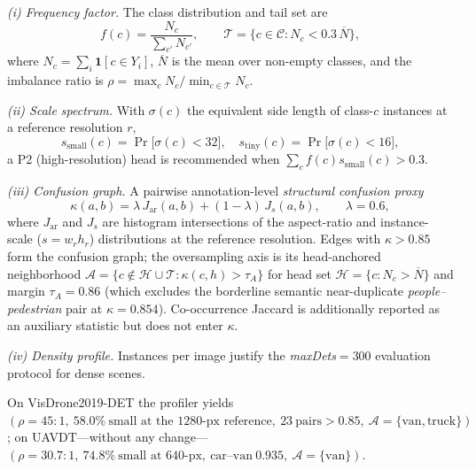 \documentclass[journal]{IEEEtran}
\newcommand{\visdrone}{VisDrone2019-DET}
\newcommand{\uavdt}{UAVDT}
\begin{document}
\emph{(i) Frequency factor.} The class distribution and tail set are
\begin{equation}
f(c)=\frac{N_c}{\sum_{c'} N_{c'}},\qquad
\mathcal{T}=\{c\in\mathcal{C}: N_c < 0.3\,\overline{N}\},
\label{eq:tail}
\end{equation}
where $N_c=\sum_i\mathbf{1}[c\in Y_i]$, $\overline{N}$ is the mean over non-empty classes, and the imbalance ratio is $\rho=\max_c N_c/\min_{c\in\mathcal{T}}N_c$.

\emph{(ii) Scale spectrum.} With $\sigma(c)$ the equivalent side length of class-$c$ instances at a reference resolution $r$,
\begin{equation}
s_{\mathrm{small}}(c)=\Pr\big[\sigma(c)<32\big],\quad
s_{\mathrm{tiny}}(c)=\Pr\big[\sigma(c)<16\big],
\label{eq:scale}
\end{equation}
a P2 (high-resolution) head is recommended when $\sum_c f(c)s_{\mathrm{small}}(c)>0.3$.

\emph{(iii) Confusion graph.} A pairwise annotation-level \emph{structural confusion proxy}
\begin{equation}
\kappa(a,b)=\lambda\,J_{\mathrm{ar}}(a,b)+(1-\lambda)\,J_{s}(a,b),\qquad \lambda=0.6,
\label{eq:conf}
\end{equation}
where $J_{\mathrm{ar}}$ and $J_{s}$ are histogram intersections of the aspect-ratio and instance-scale ($s{=}w_r h_r$) distributions at the reference resolution. Edges with $\kappa>0.85$ form the confusion graph; the oversampling axis is its head-anchored neighborhood $\mathcal{A}=\{c\notin\mathcal{H}\cup\mathcal{T}:\kappa(c,h)>\tau_A\}$ for head set $\mathcal{H}=\{c:N_c>\overline{N}\}$ and margin $\tau_A{=}0.86$ (which excludes the borderline semantic near-duplicate \emph{people--pedestrian} pair at $\kappa{=}0.854$). Co-occurrence Jaccard is additionally reported as an auxiliary statistic but does not enter $\kappa$.

\emph{(iv) Density profile.} Instances per image justify the \emph{maxDets}$=300$ evaluation protocol for dense scenes.

On \visdrone{} the profiler yields $(\rho{=}45{:}1,\ 58.0\%\ \text{small at the 1280-px reference},\ 23\ \text{pairs}>0.85,\ \mathcal{A}=\{\text{van},\text{truck}\})$; on \uavdt{}---without any change---$(\rho{=}30.7{:}1,\ 74.8\%\ \text{small at 640-px},\ \text{car--van}\ 0.935,\ \mathcal{A}=\{\text{van}\})$.
\end{document}
